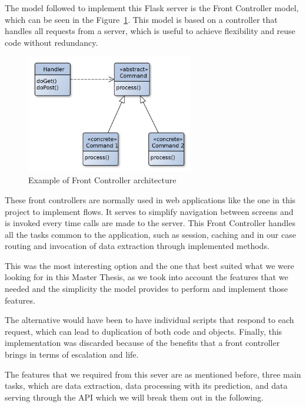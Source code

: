  
 
 The model followed to implement this Flask server is the Front Controller model, which can be seen in the Figure~\ref{fig:front-controller}. This model is based on a controller that handles all requests from a server, which is useful to achieve flexibility and reuse code without redundancy.

 
\begin{figure}[h]
    \centering
    \includegraphics[width=0.65\textwidth]{img/architecture/Front_Controller.png}
    \caption{Example of Front Controller architecture}
    \label{fig:front-controller}
\end{figure}

These front controllers are normally used in web applications like the one in this project to implement flows. It serves to simplify navigation between screens and is invoked every time calls are made to the server. This Front Controller handles all the tasks common to the application, such as session, caching and in our case routing and invocation of data extraction through implemented methods.

This was the most interesting option and the one that best suited what we were looking for in this Master Thesis, as we took into account the features that we needed and the simplicity the model provides to perform and implement those features. 

The alternative would have been to have individual scripts that respond to each request, which can lead to duplication of both code and objects. Finally, this implementation was discarded because of the benefits that a front controller brings in terms of escalation and life.

The features that we required from this sever are as mentioned before, three main tasks, which are data extraction, data processing with its prediction, and data serving through the API which we will break them out in the following.

